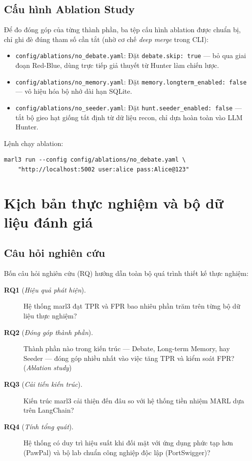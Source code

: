 \subsection{Cấu hình Ablation Study}

Để đo đóng góp của từng thành phần, ba tệp cấu hình ablation được chuẩn bị, chỉ ghi đè đúng tham số cần tắt (nhờ cơ chế \textit{deep merge} trong CLI):

\begin{itemize}
    \item \texttt{config/ablations/no\_debate.yaml}: Đặt \texttt{debate.skip: true} --- bỏ qua giai đoạn Red-Blue, dùng trực tiếp giả thuyết từ Hunter làm chiến lược.
    \item \texttt{config/ablations/no\_memory.yaml}: Đặt \texttt{memory.longterm\_enabled: false} --- vô hiệu hóa bộ nhớ dài hạn SQLite.
    \item \texttt{config/ablations/no\_seeder.yaml}: Đặt \texttt{hunt.seeder\_enabled: false} --- tắt bộ gieo hạt giống tất định từ dữ liệu recon, chỉ dựa hoàn toàn vào LLM Hunter.
\end{itemize}

Lệnh chạy ablation:

\begin{verbatim}
marl3 run --config config/ablations/no_debate.yaml \
    "http://localhost:5002 user:alice pass:Alice@123"
\end{verbatim}

\section{Kịch bản thực nghiệm và bộ dữ liệu đánh giá}
\label{sec:benchmark_setup}

\subsection{Câu hỏi nghiên cứu}
\label{sec:rqs}

Bốn câu hỏi nghiên cứu (RQ) hướng dẫn toàn bộ quá trình thiết kế thực nghiệm:

\begin{description}
    \item[\textbf{RQ1} (\textit{Hiệu quả phát hiện}).] Hệ thống marl3 đạt TPR và FPR bao nhiêu phần trăm trên từng bộ dữ liệu thực nghiệm?
    \item[\textbf{RQ2} (\textit{Đóng góp thành phần}).] Thành phần nào trong kiến trúc --- Debate, Long-term Memory, hay Seeder --- đóng góp nhiều nhất vào việc tăng TPR và kiểm soát FPR? (\textit{Ablation study})
    \item[\textbf{RQ3} (\textit{Cải tiến kiến trúc}).] Kiến trúc marl3 cải thiện đến đâu so với hệ thống tiền nhiệm MARL dựa trên LangChain?
    \item[\textbf{RQ4} (\textit{Tính tổng quát}).] Hệ thống có duy trì hiệu suất khi đối mặt với ứng dụng phức tạp hơn (PawPal) và bộ lab chuẩn công nghiệp độc lập (PortSwigger)?
\end{description}

